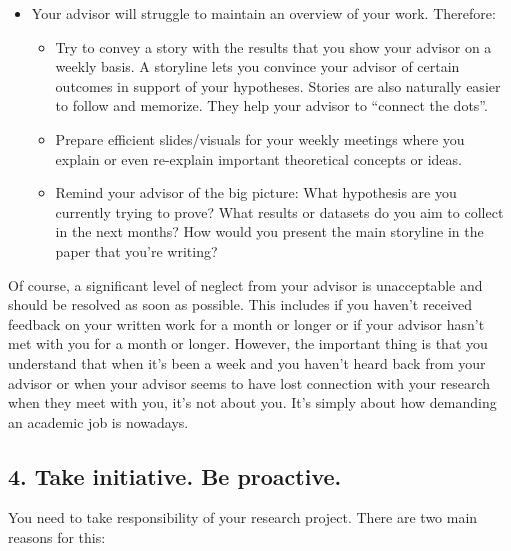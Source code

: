 \documentclass[10pt,twocolumn]{article}
\begin{document}
\begin{itemize}
\item Your advisor will struggle to maintain an overview of your work. Therefore:

\begin{itemize}
\item Try to convey a story with the results that you show your advisor on a weekly basis. A storyline lets you convince your advisor of certain outcomes in support of your hypotheses. Stories are also naturally easier to follow and memorize. They help your advisor to “connect the dots”.
\item Prepare efficient slides/visuals for your weekly meetings where you explain or even re-explain important theoretical concepts or ideas.
\item Remind your advisor of the big picture: What hypothesis are you currently trying to prove? What results or datasets do you aim to collect in the next months? How would you present the main storyline in the paper that you’re writing?
\end{itemize}

\end{itemize}

Of course, a significant level of neglect from your advisor is unacceptable and should be resolved as soon as possible. This includes if you haven’t received feedback on your written work for a month or longer or if your advisor hasn’t met with you for a month or longer. However, the important thing is that you understand that when it’s been a week and you haven’t heard back from your advisor or when your advisor seems to have lost connection with your research when they meet with you, it’s not about you. It’s simply about how demanding an academic job is nowadays.

\subsection*{4. Take initiative. Be proactive.}

You need to take responsibility of your research project. There are two main reasons for this:
\end{document}
